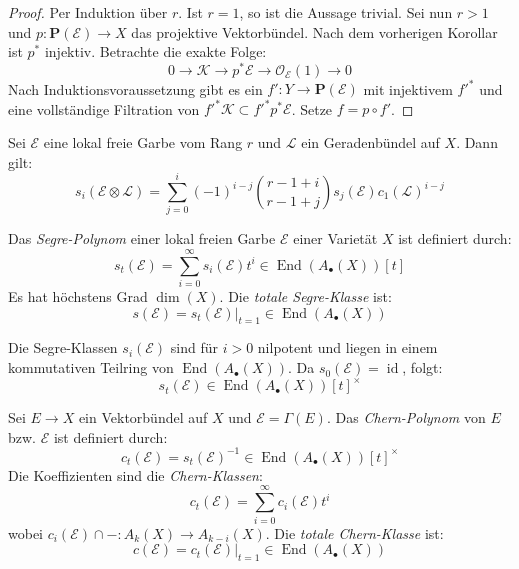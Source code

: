 \documentclass[10pt,a4paper]{article}
\begin{document}
\begin{proof}
Per Induktion über $r$. Ist $r=1$, so ist die Aussage trivial. Sei nun $r>1$ und $p: \mathbf{P}(\mathcal{E})\to X$ das projektive Vektorbündel. Nach dem vorherigen Korollar ist $p^\ast$ injektiv. Betrachte die exakte Folge: 
\[0 \longrightarrow \mathcal{K} \longrightarrow p^\ast\mathcal{E}\longrightarrow \mathcal{O}_\mathcal{E}(1) \longrightarrow 0\]
Nach Induktionsvoraussetzung gibt es ein $f': Y\to\mathbf{P}(\mathcal{E})$ mit injektivem $f'^\ast$ und eine vollständige Filtration von $f'^\ast\mathcal{K} \subset f'^\ast p^\ast\mathcal{E}$. Setze $f = p\circ f'$.
\end{proof}

\begin{proposition}
Sei $\mathcal{E}$ eine lokal freie Garbe vom Rang $r$ und $\mathcal{L}$ ein Geradenbündel auf $X$. Dann gilt:
\[ s_i(\mathcal{E}\otimes\mathcal{L}) = \sum_{j=0}^i(-1)^{i-j} \binom{r-1+i}{r-1+j}s_j(\mathcal{E}) c_1(\mathcal{L})^{i-j} \]
\end{proposition}

\begin{definition}
Das \textit{Segre-Polynom} einer lokal freien Garbe $\mathcal{E}$ einer Varietät $X$ ist definiert durch:
\[ s_t(\mathcal{E}) = \sum_{i = 0}^\infty s_i(\mathcal{E})t^i \in\operatorname{End}(A_\bullet(X))[t] \]
Es hat höchstens Grad $\dim(X)$. Die \textit{totale Segre-Klasse} ist:
\[ s(\mathcal{E}) = s_t(\mathcal{E})|_{t = 1} \in\operatorname{End}(A_\bullet(X)) \]
\end{definition}

\begin{remark}
Die Segre-Klassen $s_i(\mathcal{E})$ sind für $i>0$  nilpotent und liegen in einem kommutativen Teilring von $\operatorname{End}(A_\bullet(X))$. Da $s_0(\mathcal{E}) = \operatorname{id}$, folgt:
\[ s_t(\mathcal{E}) \in\operatorname{End}(A_\bullet(X))[t]^\times \]
\end{remark}

\begin{definition}
Sei $E\to X$ ein Vektorbündel auf $X$ und $\mathcal{E} = \Gamma(E)$. Das \textit{Chern-Polynom} von $E$ bzw. $\mathcal{E}$ ist definiert durch:
\[ c_t(\mathcal{E}) = s_t(\mathcal{E})^{-1} \in\operatorname{End}(A_\bullet(X))[t]^\times \]
Die Koeffizienten sind die \textit{Chern-Klassen}:   
\[ c_t(\mathcal{E}) = \sum_{i =0}^\infty c_i(\mathcal{E}) t^i \]
wobei $c_i(\mathcal{E})\cap - : A_k(X)\to A_{k-i}(X)$. Die \textit{totale Chern-Klasse} ist:
\[ c(\mathcal{E}) = c_t(\mathcal{E})|_{t =1}\in\operatorname{End}(A_\bullet(X)) \]
\end{definition}
\end{document}
